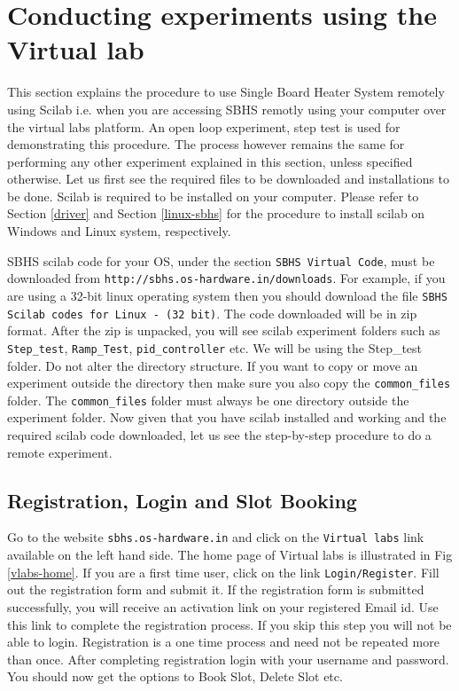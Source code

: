 \section{Conducting experiments using the Virtual lab}\label{vlabsexpt}

This section explains the procedure to use Single Board Heater System remotely using Scilab i.e. when you are accessing SBHS remotly using your computer over the virtual labs platform. An open loop experiment, step test is used for demonstrating this procedure. The process however remains the same for performing any other experiment explained in this section, unless specified otherwise. Let us first see the required files to be downloaded and installations to be done. Scilab is required to be installed on your computer. Please refer to Section \ref{driver} and Section \ref{linux-sbhs} for the procedure to install scilab on Windows and Linux system, respectively.

SBHS scilab code for your OS,  under the section {\tt SBHS Virtual Code}, must be downloaded from {\tt http://sbhs.os-hardware.in/downloads}. For example, if you are using a 32-bit linux operating system then you should download the file {\tt SBHS Scilab codes for Linux - (32 bit)}. The code downloaded will be in zip format. After the zip is unpacked, you will see scilab experiment folders such as {\tt Step\_test}, {\tt Ramp\_Test}, {\tt pid\_controller} etc. We will be using the {Step\_test} folder. Do not alter the directory structure. If you want to copy or move an experiment outside the directory then make sure you also copy the {\tt common\_files} folder. The {\tt common\_files} folder must always be one directory outside the experiment folder. Now given that you have scilab installed and working and the required scilab code downloaded, let us see the step-by-step procedure to do a remote experiment.

\subsection{Registration, Login and Slot Booking}\label{regAndslot}
 Go to the website {\tt sbhs.os-hardware.in} and click on the {\tt Virtual labs} link available on the left hand side. The home page of Virtual labs is illustrated in Fig \ref{vlabs-home}. If you are a first time user, click on the link {\tt Login/Register}. Fill out the registration form and submit it. If the registration form is submitted successfully, you will receive an activation link on your registered Email id. Use this link to complete the registration process. If you skip this step you will not be able to login. Registration is a one time process and need not be repeated more than once. After completing registration login with your username and password. You should now get the options to Book Slot, Delete Slot etc. 


